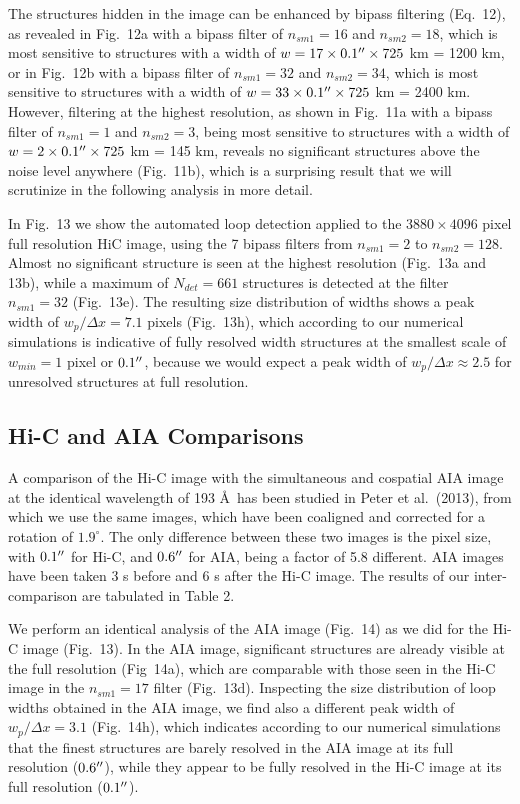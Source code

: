 \documentclass[10pt,preprint]{aastex}  %
\def\ang{\AA}
\def\arcsec{\hbox{$^{\prime\prime}$}}
\begin{document}
The structures hidden in the image can be enhanced by bipass
filtering (Eq.~12), as revealed in Fig.~12a with a bipass
filter of $n_{sm1}=16$ and $n_{sm2}=18$, which is most
sensitive to structures with a width of $w=17 \times 0.1\arcsec
\times 725$ km = 1200 km, or in Fig.~12b with a bipass
filter of $n_{sm1}=32$ and $n_{sm2}=34$, which is most
sensitive to structures with a width of $w=33 \times 0.1\arcsec
\times 725$ km = 2400 km. However, filtering at the
highest resolution, as shown in Fig.~11a with a bipass filter
of $n_{sm1}=1$ and $n_{sm2}=3$, being most sensitive to 
structures with a width of $w=2 \times 0.1\arcsec \times 725$ km 
= 145 km, reveals no significant structures above the
noise level anywhere (Fig.~11b), which is a surprising result that we
will scrutinize in the following analysis in more detail.

In Fig.~13 we show the automated loop detection applied to
the $3880 \times 4096$ pixel full resolution HiC image, using
the 7 bipass filters from $n_{sm1}=2$ to $n_{sm2}=128$.
Almost no significant structure is seen at the highest
resolution (Fig.~13a and 13b), while a maximum of 
$N_{det}=661$ structures is detected at the filter
$n_{sm1}=32$ (Fig.~13e). The resulting size distribution of
widths shows a peak width of $w_p/\Delta x =7.1$ pixels (Fig.~13h),
which according to our numerical simulations is indicative
of fully resolved width structures at the smallest scale
of $w_{min}=1$ pixel or $0.1\arcsec$, because we would expect a
peak width of $w_p/\Delta x \approx 2.5$ for unresolved structures
at full resolution. 

\subsection{	Hi-C and AIA Comparisons 		}

A comparison of the Hi-C image with the simultaneous and 
cospatial AIA image at the identical wavelength of 193 \ang \
has been studied in Peter et al.~(2013), from which we use
the same images, which have been coaligned and corrected
for a rotation of $1.9^\circ$. The only difference between
these two images is the pixel size, with $0.1\arcsec$ for
Hi-C, and $0.6\arcsec$ for AIA, being a factor of 5.8 
different. AIA images have been taken 3 s before and 6 s
after the Hi-C image. The results of our inter-comparison
are tabulated in Table 2.

We perform an identical analysis of the AIA image (Fig.~14)
as we did for the Hi-C image (Fig.~13). In the AIA image,
significant structures are already visible at the full
resolution (Fig~14a), which are comparable with those
seen in the Hi-C image in the $n_{sm1}=17$ filter (Fig.~13d).
Inspecting the size distribution of loop widths obtained
in the AIA image, we find also a different peak width
of $w_p/\Delta x = 3.1$ (Fig.~14h), which indicates according
to our numerical simulations that the finest structures
are barely resolved in the AIA image at its full resolution
($0.6\arcsec$), while they appear to be fully resolved
in the Hi-C image at its full resolution ($0.1\arcsec$).
\end{document}

